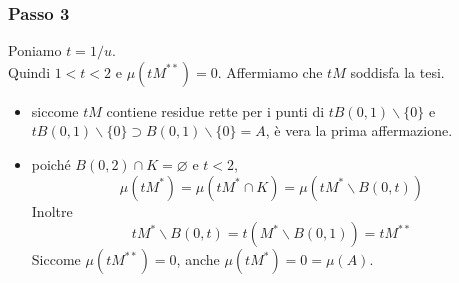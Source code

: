 \documentclass[11pt]{beamer} %
\newcommand{\<}{\langle}
\renewcommand{\>}{\rangle}
\theoremstyle{theorem}
\theoremstyle{theorem}
\theoremstyle{theorem}
\theoremstyle{theorem}
\theoremstyle{theorem}
\begin{document}
\begin{frame}
\frametitle{Passo 3}
Poniamo $t=1 / u$.\\ 
Quindi $1<t<2$ e $\mu\left(t M^{* *}\right)=0$. Affermiamo che $t M$ soddisfa la tesi.\\ \pause
\begin{itemize}
	\item siccome $t M$ contiene residue rette per i punti di $t B(0,1) \backslash\{0\}$ e $t B(0,1) \backslash\{0\} \supset B(0,1) \backslash\{0\}=A$, è vera la prima affermazione.\\
	\item poiché $B(0,2) \cap K=\varnothing$ e $t<2$,
	$$ \mu\left(t M^{*}\right)=\mu\left(t M^{*} \cap K\right)=\mu\left(t M^{*} \backslash B(0, t)\right) $$
	Inoltre
	$$ t M^{*} \backslash B(0, t)=t\left(M^{*} \backslash B(0,1)\right)=t M^{* *} $$
	Siccome $\mu\left(t M^{* *}\right)=0$, anche $\mu (tM^*)= 0= \mu(A)$.
\end{itemize}
\end{frame}
\end{document}
